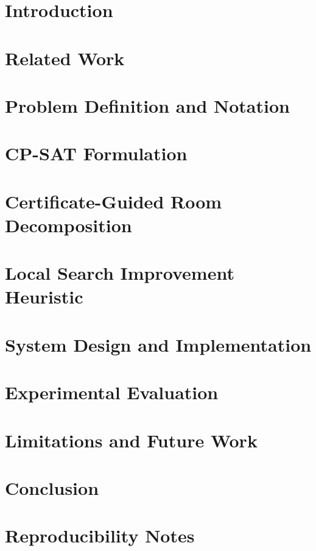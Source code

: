 \documentclass[conference]{IEEEtran}
\providecommand{\appendices}{\appendix}
\begin{document}
\section{Introduction}


\section{Related Work}


\section{Problem Definition and Notation}


\section{CP-SAT Formulation}


\section{Certificate-Guided Room Decomposition}


\section{Local Search Improvement Heuristic}


\section{System Design and Implementation}


\section{Experimental Evaluation}

\FloatBarrier

\section{Limitations and Future Work}


\section{Conclusion}




\appendices
\section{Reproducibility Notes}

\end{document}

